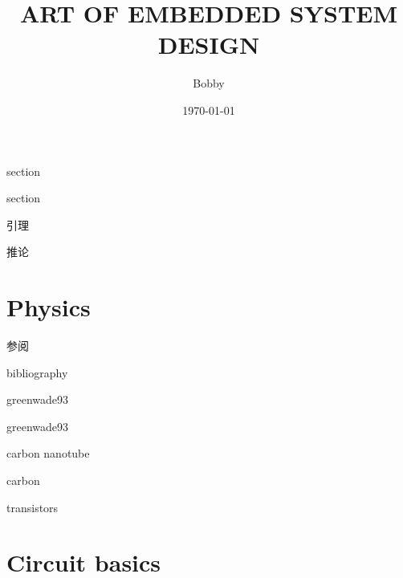 \documentclass[12pt,a4paper,UTF8]{ctexbook}
\title{ART OF EMBEDDED SYSTEM DESIGN }
\author{Bobby}
\date{\today}
\begin{document}
	
	\maketitle
	\frontmatter
	

	\tableofcontents
	
	
		
	\newtheorem{definition}{定义}{section}
	\newtheorem{theorem}{定理}{section}
	\newtheorem{lemma}{theorem}{引理}
	\newtheorem{corollary}{theorem}{推论}
	
	
	\mainmatter
	\part{Physics}
	\label{Physics}
	

	\begin{comment} 
	\chapter{Solid state physics}
	\label{Solid state physics}
	\chapter{Semiconductor physics}
	\label{Semiconductor physics}
	\end{comment}
	参阅\cite{dreyer2010chemistry}


	bibliography

	greenwade93\cite{greenwade93}

	greenwade93\cite{Xarticle}

	carbon nanotube\cite{dreyer2010chemistry}

	carbon\cite{geim2007rise}

	transistors\cite{novoselov2005two}






	
	
	\part{Circuit basics}
	\label{Circuit basics}
	
	
\end{document}
